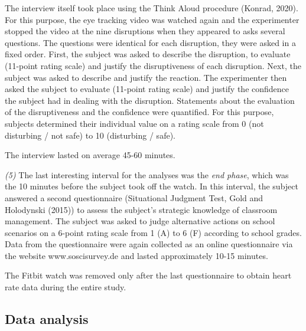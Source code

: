 \documentclass[
  man,floatsintext]{apa6}
\begin{document}
The interview itself took place using the Think Aloud procedure (Konrad, 2020). For this purpose, the eye tracking video was watched again and the experimenter stopped the video at the nine disruptions when they appeared to asks several questions. The questions were identical for each disruption, they were asked in a fixed order.
First, the subject was asked to describe the disruption, to evaluate (11-point rating scale) and justify the disruptiveness of each disruption. Next, the subject was asked to describe and justify the reaction. The experimenter then asked the subject to evaluate (11-point rating scale) and justify the confidence the subject had in dealing with the disruption. Statements about the evaluation of the disruptiveness and the confidence were quantified. For this purpose, subjects determined their individual value on a rating scale from 0 (not disturbing / not safe) to 10 (disturbing / safe).

The interview lasted on average 45-60 minutes.

\emph{(5)} The last interesting interval for the analyses was the \emph{end phase}, which was the 10 minutes before the subject took off the watch. In this interval, the subject answered a second questionnaire (Situational Judgment Test, Gold and Holodynski (2015)) to assess the subject's strategic knowledge of classroom management. The subject was asked to judge alternative actions on school scenarios on a 6-point rating scale from 1 (A) to 6 (F) according to school grades. Data from the questionnaire were again collected as an online questionnaire via the website www.soscisurvey.de and lasted approximately 10-15 minutes.

The Fitbit watch was removed only after the last questionnaire to obtain heart rate data during the entire study.

\hypertarget{data-analysis}{%
\subsection{Data analysis}\label{data-analysis}}
\end{document}
